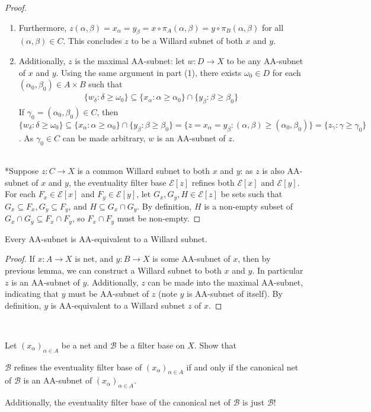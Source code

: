 \documentclass{treatise}
\begin{document}
\begin{proof}
\begin{enumerate}
\begin{enumerate}
    \end{enumerate}
    \item Furthermore, $z(\alpha, \beta) = x_\alpha = y_\beta = x \circ \pi_A (\alpha, \beta) = y \circ \pi_B (\alpha, \beta)$ for all $(\alpha, \beta) \in C$. This concludes $z$ to be a Willard subnet of both $x$ and $y$.
    \item Additionally, $z$ is the maximal AA-subnet: let $w: D \to X$ to be any AA-subnet of $x$ and $y$. Using the same argument in part (1), there exists $\omega_0 \in D$ for each $(\alpha_0, \beta_0) \in A \times B$ such that
    \begin{align*}
        \{ w_\delta : \delta \geq \omega_0 \} \subseteq \{ x_\alpha : \alpha \geq \alpha_0 \} \cap \{ y_\beta : \beta \geq \beta_0 \}
    \end{align*}
    If $\gamma_0 = (\alpha_0, \beta_0) \in C$, then $\{ w_\delta : \delta \geq \omega_0 \} \subseteq \{ x_\alpha : \alpha \geq \alpha_0 \} \cap \{ y_\beta : \beta \geq \beta_0 \} = \{ z = x_\alpha = y_\beta : (\alpha, \beta) \geq (\alpha_0, \beta_0) \} = \{ z_\gamma : \gamma \geq \gamma_0 \}$. As $\gamma_0 \in C$ can be made arbitrary, $w$ is an AA-subnet of $z$.
\end{enumerate}
\ \\
*Suppose $z: C \to X$ is a common Willard subnet to both $x$ and $y$: as $z$ is also AA-subnet of $x$ and $y$, the eventuality filter base $\mathcal{E}[z]$ refines both $\mathcal{E}[x]$ and $\mathcal{E}[y]$. For each $F_x \in \mathcal{E}[x]$ and $F_y \in \mathcal{E}[y]$, let $G_x, G_y, H \in \mathcal{E}[z]$ be sets such that $G_x \subseteq F_x, G_y \subseteq F_y$, and $H \subseteq G_x \cap G_y$. By definition, $H$ is a non-empty subset of $G_x \cap G_y \subseteq F_x \cap F_y$, so $F_x \cap F_y$ must be non-empty.
\end{proof}
\begin{corollary}
Every AA-subnet is AA-equivalent to a Willard subnet.
\end{corollary}
\begin{proof}
If $x: A \to X$ is net, and $y: B \to X$ is some AA-subnet of $x$, then by previous lemma, we can construct a Willard subnet to both $x$ and $y$. In particular $z$ is an AA-subnet of $y$. Additionally, $z$ can be made into the maximal AA-subnet, indicating that $y$ must be AA-subnet of $z$ (note $y$ is AA-subnet of itself). By definition, $y$ is AA-equivalent to a Willard subnet $z$ of $x$.
\end{proof}
\ 
\\
\begin{proposition} \label{conv-trans-adjunct-ii}
Let $(x_\alpha)_{\alpha \in A}$ be a net and $\mathcal{B}$ be a filter base on $X$. Show that
\begin{center}
    $\mathcal{B}$ refines the eventuality filter base of $(x_\alpha)_{\alpha \in A}$ if and only if the canonical net of $\mathcal{B}$ is an AA-subnet of $(x_\alpha)_{\alpha \in A}$.
\end{center}
Additionally, the eventuality filter base of the canonical net of $\mathcal{B}$ is just $\mathcal{B}$!
\end{proposition}
\end{document}
